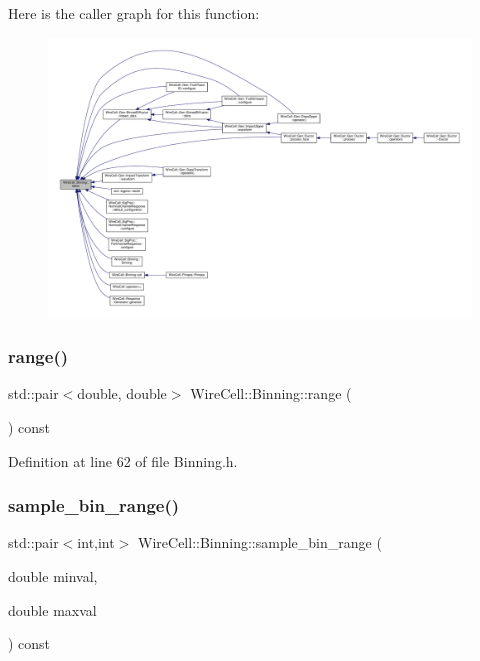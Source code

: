 Here is the caller graph for this function\+:
\nopagebreak
\begin{figure}[H]
\begin{center}
\leavevmode
\includegraphics[width=350pt]{class_wire_cell_1_1_binning_aaac66033ecc76a899c18f8f09404c419_icgraph}
\end{center}
\end{figure}
\mbox{\label{class_wire_cell_1_1_binning_a978a1bd9f17264316b5419f5ea5e3253}} 
\subsubsection{\texorpdfstring{range()}{range()}}
{\footnotesize\ttfamily std\+::pair$<$double, double$>$ Wire\+Cell\+::\+Binning\+::range (\begin{DoxyParamCaption}{ }\end{DoxyParamCaption}) const\hspace{0.3cm}{\ttfamily [inline]}}



Definition at line 62 of file Binning.\+h.

\mbox{\label{class_wire_cell_1_1_binning_a7f4e8459c55ad288fff22553d8ed8cdd}} 
\subsubsection{\texorpdfstring{sample\+\_\+bin\+\_\+range()}{sample\_bin\_range()}}
{\footnotesize\ttfamily std\+::pair$<$int,int$>$ Wire\+Cell\+::\+Binning\+::sample\+\_\+bin\+\_\+range (\begin{DoxyParamCaption}\item[{double}]{minval,  }\item[{double}]{maxval }\end{DoxyParamCaption}) const\hspace{0.3cm}{\ttfamily [inline]}}


